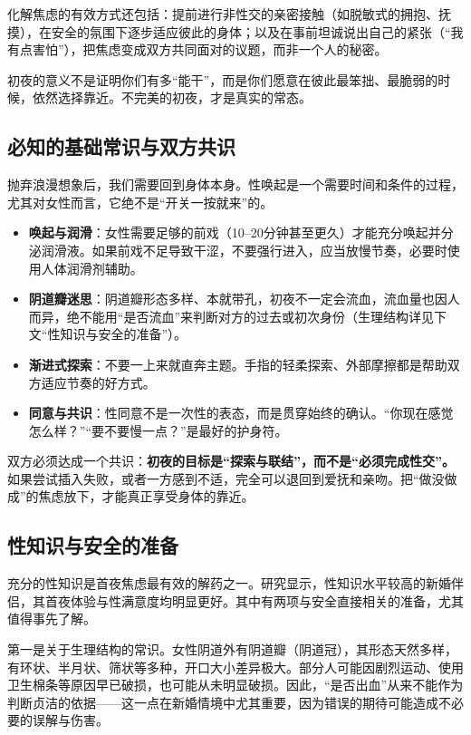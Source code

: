 \documentclass[12pt,UTF8]{ctexbook}
\begin{document}
化解焦虑的有效方式还包括：提前进行非性交的亲密接触（如脱敏式的拥抱、抚摸），在安全的氛围下逐步适应彼此的身体；以及在事前坦诚说出自己的紧张（“我有点害怕”），把焦虑变成双方共同面对的议题，而非一个人的秘密。

\begin{tcolorbox}[colback=pink!5!white,colframe=red!50!black,title=贴心小叮咛]
初夜的意义不是证明你们有多“能干”，而是你们愿意在彼此最笨拙、最脆弱的时候，依然选择靠近。不完美的初夜，才是真实的常态。
\end{tcolorbox}

\subsection{必知的基础常识与双方共识}

抛弃浪漫想象后，我们需要回到身体本身。性唤起是一个需要时间和条件的过程，尤其对女性而言，它绝不是“开关一按就来”的。

\begin{itemize}
\item \textbf{唤起与润滑}：女性需要足够的前戏（10--20分钟甚至更久）才能充分唤起并分泌润滑液。如果前戏不足导致干涩，不要强行进入，应当放慢节奏，必要时使用人体润滑剂辅助。
\item \textbf{阴道瓣迷思}：阴道瓣形态多样、本就带孔，初夜不一定会流血，流血量也因人而异，绝不能用“是否流血”来判断对方的过去或初次身份（生理结构详见下文“性知识与安全的准备”）。
\item \textbf{渐进式探索}：不要一上来就直奔主题。手指的轻柔探索、外部摩擦都是帮助双方适应节奏的好方式。
\item \textbf{同意与共识}：性同意不是一次性的表态，而是贯穿始终的确认。“你现在感觉怎么样？”“要不要慢一点？”是最好的护身符。
\end{itemize}

双方必须达成一个共识：\textbf{初夜的目标是“探索与联结”，而不是“必须完成性交”。}如果尝试插入失败，或者一方感到不适，完全可以退回到爱抚和亲吻。把“做没做成”的焦虑放下，才能真正享受身体的靠近。

\subsection{性知识与安全的准备}

充分的性知识是首夜焦虑最有效的解药之一。研究显示，性知识水平较高的新婚伴侣，其首夜体验与性满意度均明显更好。其中有两项与安全直接相关的准备，尤其值得事先了解。

第一是关于生理结构的常识。女性阴道外有阴道瓣（阴道冠），其形态天然多样，有环状、半月状、筛状等多种，开口大小差异极大。部分人可能因剧烈运动、使用卫生棉条等原因早已破损，也可能从未明显破损。因此，“是否出血”从来不能作为判断贞洁的依据——这一点在新婚情境中尤其重要，因为错误的期待可能造成不必要的误解与伤害。
\end{document}
